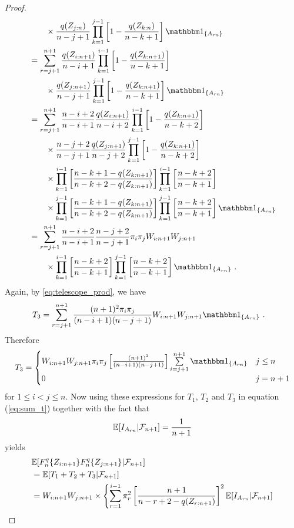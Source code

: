 \begin{proof}
\begin{align*}
	&\qquad \times \frac{q(Z_{j:n})}{n-j+1} \prod\limits_{k=1}^{j-1} \left[1-\frac{q(Z_{k:n})}{n-k+1}\right]\I{A_{rn}}\\
	&= \sum\limits_{r=j+1}^{n+1} \frac{q(Z_{i:n+1})}{n-i+1} \prod\limits_{k=1}^{i-1} \left[1-\frac{q(Z_{k:n+1})}{n-k+1}\right]\\
	&\qquad \times \frac{q(Z_{j:n+1})}{n-j+1} \prod\limits_{k=1}^{j-1} \left[1-\frac{q(Z_{k:n+1})}{n-k+1}\right]\I{A_{rn}}\\	
	&= \sum\limits_{r=j+1}^{n+1} \frac{n-i+2}{n-i+1}\frac{q(Z_{i:n+1})}{n-i+2} \prod\limits_{k=1}^{i-1} \left[1-\frac{q(Z_{k:n+1})}{n-k+2}\right]\\
	&\qquad \times \frac{n-j+2}{n-j+1}\frac{q(Z_{j:n+1})}{n-j+2} \prod\limits_{k=1}^{j-1} \left[1-\frac{q(Z_{k:n+1})}{n-k+2}\right]\\	
	&\qquad \times \prod\limits_{k=1}^{i-1} \left[\frac{n-k+1-q(Z_{k:n+1})}{n-k+2-q(Z_{k:n+1})}\right]\prod\limits_{k=1}^{i-1} \left[\frac{n-k+2}{n-k+1}\right]\\
	&\qquad \times \prod\limits_{k=1}^{j-1} \left[\frac{n-k+1-q(Z_{k:n+1})}{n-k+2-q(Z_{k:n+1})}\right]\prod\limits_{k=1}^{j-1} \left[\frac{n-k+2}{n-k+1}\right]\I{A_{rn}}\\
	&= \sum\limits_{r=j+1}^{n+1} \frac{n-i+2}{n-i+1}\frac{n-j+2}{n-j+1}\pi_i\pi_j \wn{i}{n+1}\wn{j}{n+1}\\	
	&\qquad \times \prod\limits_{k=1}^{i-1} \left[\frac{n-k+2}{n-k+1}\right] \prod\limits_{k=1}^{j-1} \left[\frac{n-k+2}{n-k+1}\right]\I{A_{rn}}\mdot
\end{align*}
%
Again, by \eqref{eq:telescope_prod}, we have
\begin{align*}
T_3 &= \sum\limits_{r=j+1}^{n+1} \frac{(n+1)^2\pi_i\pi_j}{(n-i+1)(n-j+1)}\wn{i}{n+1}\wn{j}{n+1}\I{A_{rn}}\mdot
\end{align*}
%
Therefore
\[T_3 = \begin{cases} 
      \wn{i}{n+1}\wn{j}{n+1}\pi_i\pi_j\left[\frac{(n+1)^2}{(n-i+1)(n-j+1)}\right]\sum\limits_{i=j+1}^{n+1}\I{A_{rn}} & j\leq n \\
			0 & j=n+1
   \end{cases}
\]
for $1\leq i<j\leq n$.
%
Now using these expressions for $T_1$, $T_2$ and $T_3$ in equation (\ref{eq:sum_t}) together with the fact that 
$$\mathbb{E}[I_{A_{rn}}|\mathcal{F}_{n+1}] = \frac{1}{n+1}$$
yields
\begin{align*}
	&  \E[F_n^q\{Z_{i:n+1}\}F_n^q\{Z_{j:n+1}\}|\F_{n+1}]\\
	&= \E[T_1 + T_2 + T_3|\F_{n+1}]\\
	&= \wn{i}{n+1}\wn{j}{n+1} \times \left\{\sum\limits_{r=1}^{i-1}\pi_r^2\left[\frac{n+1}{n-r+2-q(Z_{r:n+1})} \right]^2 \E[I_{A_{rn}}|\F_{n+1}]\right.\\

\end{align*}
\end{proof}
